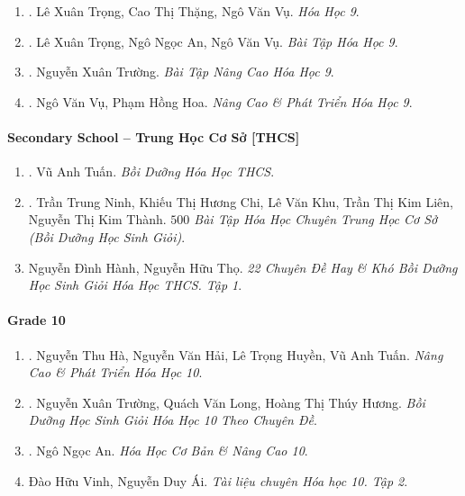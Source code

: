 \documentclass{article}
\begin{document}
\begin{enumerate}	
	\item \cite{SGK_Hoa_Hoc_9}. Lê Xuân Trọng, Cao Thị Thặng, Ngô Văn Vụ. {\it Hóa Học 9}.\hfill{\sf[reading]}
	\item \cite{SBT_Hoa_Hoc_9}. Lê Xuân Trọng, Ngô Ngọc An, Ngô Văn Vụ. {\it Bài Tập Hóa Học 9}.\hfill{\sf[reading]}
	\item \cite{Truong_BTNC_Hoa_Hoc_9_2021}. Nguyễn Xuân Trường. {\it Bài Tập Nâng Cao Hóa Học 9}.\hfill{\sf[reading]}
	\item \cite{Vu_Hoa2021}. Ngô Văn Vụ, Phạm Hồng Hoa. {\it Nâng Cao \& Phát Triển Hóa Học 9}.\hfill{\sf[reading]}
\end{enumerate}

\paragraph{Secondary School -- Trung Học Cơ Sở [THCS]}

\begin{enumerate}
	\item \cite{Tuan2022}. Vũ Anh Tuấn. {\it Bồi Dưỡng Hóa Học THCS}.\hfill{\sf[reading]}
	\item \cite{Ninh_Chi_Khu_Lien_Thanh2019}. Trần Trung Ninh, Khiếu Thị Hương Chi, Lê Văn Khu, Trần Thị Kim Liên, Nguyễn Thị Kim Thành. {\it $500$ Bài Tập Hóa Học Chuyên Trung Học Cơ Sở (Bồi Dưỡng Học Sinh Giỏi)}.\hfill{\sf[reading]}
	\item Nguyễn Đình Hành, Nguyễn Hữu Thọ. {\it 22 Chuyên Đề Hay \& Khó Bồi Dưỡng Học Sinh Giỏi Hóa Học THCS. Tập 1}.
\end{enumerate}

\paragraph{Grade 10}

\begin{enumerate}
	\item \cite{Ha_Hai_Huyen_Tuan2022}. Nguyễn Thu Hà, Nguyễn Văn Hải, Lê Trọng Huyền, Vũ Anh Tuấn. {\it Nâng Cao \& Phát Triển Hóa Học 10}.\hfill{\sf[reading]}
	\item \cite{Truong_Long_Huong_bdhsg_Hoa_Hoc_10}. Nguyễn Xuân Trường, Quách Văn Long, Hoàng Thị Thúy Hương. {\it Bồi Dưỡng Học Sinh Giỏi Hóa Học 10 Theo Chuyên Đề}.\hfill{\sf[reading]}
	\item \cite{An_Hoa_Hoc_co_ban_nang_cao_10}. Ngô Ngọc An. {\it Hóa Học Cơ Bản \& Nâng Cao 10}.\hfill{\sf[reading]}
	\item Đào Hữu Vinh, Nguyễn Duy Ái. {\it Tài liệu chuyên Hóa học 10. Tập 2}.\hfill{\sf[reading]}
\end{enumerate}
\end{document}
